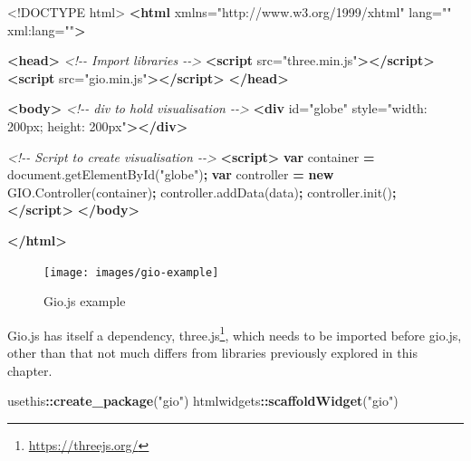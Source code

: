 \documentclass[
  10pt,
]{krantz}
\makeatletter
\newenvironment{Shaded}{\begin{snugshade}}{\end{snugshade}}
\newcommand{\AttributeTok}[1]{\textcolor[rgb]{0.61,0.61,0.61}{#1}}
\newcommand{\CommentTok}[1]{\textcolor[rgb]{0.37,0.37,0.37}{\textit{#1}}}
\newcommand{\DataTypeTok}[1]{\textcolor[rgb]{0.27,0.27,0.27}{#1}}
\newcommand{\KeywordTok}[1]{\textcolor[rgb]{0.27,0.27,0.27}{\textbf{#1}}}
\newcommand{\NormalTok}[1]{#1}
\newcommand{\OperatorTok}[1]{\textcolor[rgb]{0.43,0.43,0.43}{\textbf{#1}}}
\newcommand{\OtherTok}[1]{\textcolor[rgb]{0.37,0.37,0.37}{#1}}
\newcommand{\StringTok}[1]{\textcolor[rgb]{0.5,0.5,0.5}{#1}}
\newcommand{\VariableTok}[1]{\textcolor[rgb]{0,0,0}{#1}}
\renewcommand{\href}[2]{#2\footnote{\url{#1}}}
\newenvironment{kframe}{%
\medskip{}
\setlength{\fboxsep}{.8em}
 \def\at@end@of@kframe{}%
 \ifinner\ifhmode%
  \def\at@end@of@kframe{\end{minipage}}%
  \begin{minipage}{\columnwidth}%
 \fi\fi%
 \def\FrameCommand##1{\hskip\@totalleftmargin \hskip-\fboxsep
 \colorbox{shadecolor}{##1}\hskip-\fboxsep
     \hskip-\linewidth \hskip-\@totalleftmargin \hskip\columnwidth}%
 \MakeFramed {\advance\hsize-\width
   \@totalleftmargin\z@ \linewidth\hsize
   \@setminipage}}%
 {\par\unskip\endMakeFramed%
 \at@end@of@kframe}
\renewenvironment{Shaded}{\begin{kframe}}{\end{kframe}}
\makeatother
\begin{document}
\begin{Shaded}
\begin{Highlighting}[]
\DataTypeTok{<!DOCTYPE }\NormalTok{html}\DataTypeTok{>}
\KeywordTok{<html}\OtherTok{ xmlns=}\StringTok{"http://www.w3.org/1999/xhtml"}\OtherTok{ lang=}\StringTok{""}\OtherTok{ xml:lang=}\StringTok{""}\KeywordTok{>}

\KeywordTok{<head>}
  \CommentTok{<!{-}{-} Import libraries {-}{-}>}
  \KeywordTok{<script}\OtherTok{ src=}\StringTok{"three.min.js"}\KeywordTok{></script>}
  \KeywordTok{<script}\OtherTok{ src=}\StringTok{"gio.min.js"}\KeywordTok{></script>}
\KeywordTok{</head>}

\KeywordTok{<body>}
  \CommentTok{<!{-}{-} div to hold visualisation {-}{-}>}
  \KeywordTok{<div}\OtherTok{ id=}\StringTok{"globe"}\OtherTok{ style=}\StringTok{"width: 200px; height: 200px"}\KeywordTok{></div>}

  \CommentTok{<!{-}{-} Script to create visualisation {-}{-}>}
  \KeywordTok{<script>}
    \KeywordTok{var}\NormalTok{ container }\OperatorTok{=} \VariableTok{document}\NormalTok{.}\AttributeTok{getElementById}\NormalTok{(}\StringTok{"globe"}\NormalTok{)}\OperatorTok{;}
    \KeywordTok{var}\NormalTok{ controller }\OperatorTok{=} \KeywordTok{new} \VariableTok{GIO}\NormalTok{.}\AttributeTok{Controller}\NormalTok{(container)}\OperatorTok{;}
    \VariableTok{controller}\NormalTok{.}\AttributeTok{addData}\NormalTok{(data)}\OperatorTok{;}
    \VariableTok{controller}\NormalTok{.}\AttributeTok{init}\NormalTok{()}\OperatorTok{;}
  \KeywordTok{</script>}
\KeywordTok{</body>}

\KeywordTok{</html>}
\end{Highlighting}
\end{Shaded}

\begin{figure}[H]

{\centering \texttt{[image: images/gio-example]} 

}

\caption{Gio.js example}\label{fig:gio-example}
\end{figure}

Gio.js has itself a dependency, \href{https://threejs.org/}{three.js}, which needs to be imported before gio.js, other than that not much differs from libraries previously explored in this chapter.

\begin{Shaded}
\begin{Highlighting}[]
\NormalTok{usethis}\OperatorTok{::}\KeywordTok{create\_package}\NormalTok{(}\StringTok{"gio"}\NormalTok{)}
\NormalTok{htmlwidgets}\OperatorTok{::}\KeywordTok{scaffoldWidget}\NormalTok{(}\StringTok{"gio"}\NormalTok{)}
\end{Highlighting}
\end{Shaded}
\end{document}
